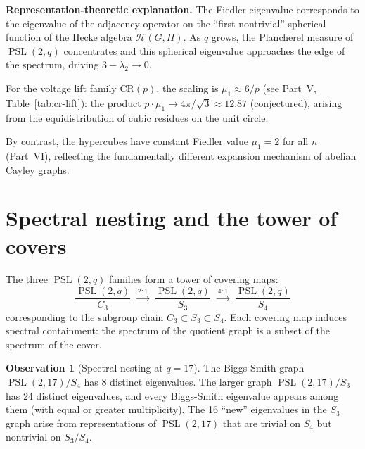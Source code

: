 \documentclass[11pt,a4paper]{article}
\theoremstyle{plain}
\theoremstyle{definition}
\newtheorem{observation}[theorem]{Observation}
\theoremstyle{remark}
\newcommand{\PSL}{\operatorname{PSL}}
\newcommand{\CR}{\mathrm{CR}}
\begin{document}
\begin{tcolorbox}[colback=yellow!10, colframe=yellow!10,
  boxrule=0pt, sharp corners]
\textbf{Representation-theoretic explanation.}
The Fiedler
eigenvalue corresponds to the eigenvalue of the adjacency operator on
the ``first nontrivial'' spherical function of the Hecke algebra
$\mathcal{H}(G, H)$. As $q$ grows, the Plancherel measure of
$\PSL(2,q)$ concentrates and this spherical eigenvalue approaches the
edge of the spectrum, driving $3 - \lambda_2 \to 0$.
\end{tcolorbox}

For the voltage lift family $\CR(p)$, the scaling is
$\mu_1 \approx 6/p$ (see Part~V, Table~\ref{tab:cr-lift}):
the product $p \cdot \mu_1 \to 4\pi/\sqrt{3} \approx 12.87$ (conjectured),
arising from the equidistribution of cubic residues on the unit circle.

By contrast, the hypercubes have constant Fiedler value $\mu_1 = 2$ for
all $n$ (Part~VI), reflecting the fundamentally different expansion
mechanism of abelian Cayley graphs.


\section{Spectral nesting and the tower of covers}

The three $\PSL(2,q)$ families form a tower of covering maps:
\[
\frac{\PSL(2,q)}{C_3}
\;\xrightarrow{\ 2:1\ }\;
\frac{\PSL(2,q)}{S_3}
\;\xrightarrow{\ 4:1\ }\;
\frac{\PSL(2,q)}{S_4}
\]
corresponding to the subgroup chain $C_3 \subset S_3 \subset S_4$.
Each covering map induces spectral containment: the spectrum of the
quotient graph is a subset of the spectrum of the cover.

\begin{tcolorbox}[colback=black!5, colframe=black!5,
  boxrule=0pt, sharp corners]
\begin{observation}[Spectral nesting at $q = 17$]
The Biggs-Smith graph $\PSL(2,17)/S_4$ has 8 distinct eigenvalues.
The larger graph $\PSL(2,17)/S_3$ has 24 distinct eigenvalues, and
every Biggs-Smith eigenvalue appears among them (with equal or greater
multiplicity). The 16 ``new'' eigenvalues in the $S_3$ graph arise from
representations of $\PSL(2,17)$ that are trivial on $S_4$ but nontrivial
on $S_3/S_4$.
\end{observation}
\end{tcolorbox}
\end{document}
